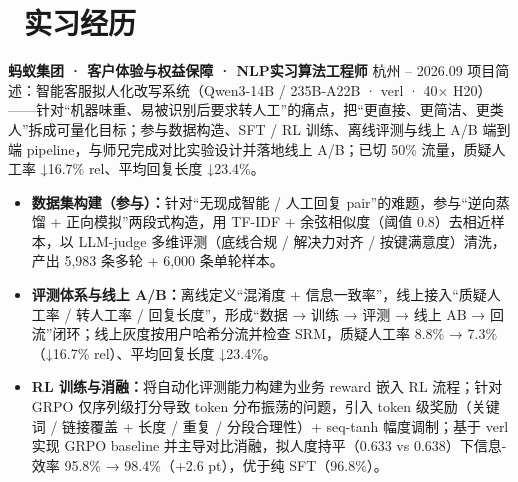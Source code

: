 \section{\makebox[\widthof{\faBriefcase}][c]{\color{CVBlue}\faBriefcase}\ 实习经历}

\textbf{蚂蚁集团 · 客户体验与权益保障 · NLP实习算法工程师} \hfill 杭州  -- 2026.09 \titlebreak
项目简述：智能客服拟人化改写系统（Qwen3-14B / 235B-A22B · verl · 40× H20）——针对“机器味重、易被识别后要求转人工”的痛点，把“更直接、更简洁、更类人”拆成可量化目标；参与数据构造、SFT / RL 训练、离线评测与线上 A/B 端到端 pipeline，与师兄完成对比实验设计并落地线上 A/B；已切 50\% 流量，质疑人工率 ↓16.7\% rel、平均回复长度 ↓23.4\%。
\begin{itemize}[nosep]
    \item \textbf{数据集构建（参与）：}针对“无现成智能 / 人工回复 pair”的难题，参与“逆向蒸馏 + 正向模拟”两段式构造，用 TF-IDF + 余弦相似度（阈值 0.8）去相近样本，以 LLM-judge 多维评测（底线合规 / 解决力对齐 / 按键满意度）清洗，产出 5,983 条多轮 + 6,000 条单轮样本。
    \item \textbf{评测体系与线上 A/B：}离线定义“混淆度 + 信息一致率”，线上接入“质疑人工率 / 转人工率 / 回复长度”，形成“数据 → 训练 → 评测 → 线上 AB → 回流”闭环；线上灰度按用户哈希分流并检查 SRM，质疑人工率 8.8\% → 7.3\%（↓16.7\% rel）、平均回复长度 ↓23.4\%。
    \item \textbf{RL 训练与消融：}将自动化评测能力构建为业务 reward 嵌入 RL 流程；针对 GRPO 仅序列级打分导致 token 分布振荡的问题，引入 token 级奖励（关键词 / 链接覆盖 + 长度 / 重复 / 分段合理性）+ seq-tanh 幅度调制；基于 verl 实现 GRPO baseline 并主导对比消融，拟人度持平（0.633 vs 0.638）下信息-效率 95.8\% → 98.4\%（+2.6 pt），优于纯 SFT（96.8\%）。
\end{itemize}

